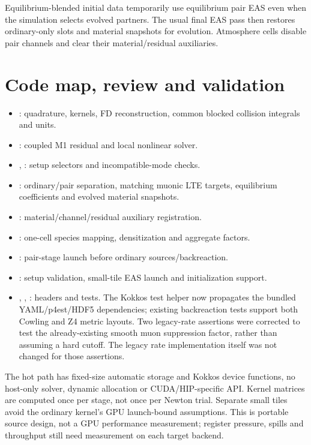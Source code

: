 \documentclass[11pt,a4paper]{article}
\begin{document}
Equilibrium-blended initial data temporarily use equilibrium pair EAS even
when the simulation selects evolved partners. The usual final EAS pass then
restores ordinary-only slots and material snapshots for evolution. Atmosphere
cells disable pair channels and clear their material/residual auxiliaries.

\section{Code map, review and validation}

\begin{itemize}
\item {}: quadrature, kernels, FD
  reconstruction, common blocked collision integrals and units.
\item {}: coupled M1 residual and local nonlinear
  solver.
\item {}, : setup selectors and
  incompatible-mode checks.
\item {}: ordinary/pair separation, matching muonic LTE
  targets, equilibrium coefficients and evolved material snapshots.
\item {}: material/channel/residual auxiliary
  registration.
\item {}: one-cell species mapping, densitization and aggregate factors.
\item {}: pair-stage launch before ordinary sources/backreaction.
\item {}: setup validation, small-tile EAS launch and initialization
  support.
\item {}, ,
  : headers and tests. The Kokkos test helper now
  propagates the bundled YAML/p4est/HDF5 dependencies; existing backreaction
  tests support both Cowling and Z4 metric layouts. Two legacy-rate assertions
  were corrected to test the already-existing smooth muon suppression factor,
  rather than assuming a hard cutoff. The legacy rate implementation itself
  was not changed for those assertions.
\end{itemize}

The hot path has fixed-size automatic storage and Kokkos device functions, no
host-only solver, dynamic allocation or CUDA/HIP-specific API. Kernel matrices
are computed once per stage, not once per Newton trial. Separate small tiles
avoid the ordinary kernel's GPU launch-bound assumptions. This is portable
source design, not a GPU performance measurement; register pressure, spills
and throughput still need measurement on each target backend.
\end{document}
